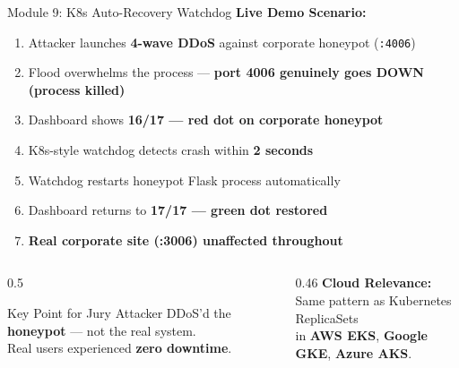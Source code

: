 \documentclass[aspectratio=169,12pt]{beamer}
\begin{document}
\begin{frame}{Module 9: K8s Auto-Recovery Watchdog}
  \textbf{\textcolor{dcCyan}{Live Demo Scenario:}}

  \vspace{0.3em}
  \begin{enumerate}\small
    \item Attacker launches \textbf{4-wave DDoS} against corporate honeypot (\texttt{:4006})
    \item Flood overwhelms the process ---
          \textcolor{dcRed}{\textbf{port 4006 genuinely goes DOWN (process killed)}}
    \item Dashboard shows \textcolor{dcRed}{\textbf{16/17 --- red dot on corporate honeypot}}
    \item K8s-style watchdog detects crash within \textbf{2 seconds}
    \item Watchdog restarts honeypot Flask process automatically
    \item Dashboard returns to \textcolor{dcGreen}{\textbf{17/17 --- green dot restored}}
    \item \textcolor{dcGreen}{\textbf{Real corporate site (:3006) unaffected throughout}}
  \end{enumerate}

  \vspace{0.3em}
  \begin{columns}[T]
    \begin{column}{0.5\textwidth}
      \begin{block}{Key Point for Jury}
        \small Attacker DDoS'd the \textbf{honeypot} --- not the real system.\\
        Real users experienced \textbf{zero downtime}.
      \end{block}
    \end{column}
    \begin{column}{0.46\textwidth}
      \textbf{\textcolor{dcGray}{Cloud Relevance:}}\\
      \small Same pattern as Kubernetes ReplicaSets\\
      in \textbf{AWS EKS}, \textbf{Google GKE}, \textbf{Azure AKS}.
    \end{column}
  \end{columns}
\end{frame}
\end{document}
